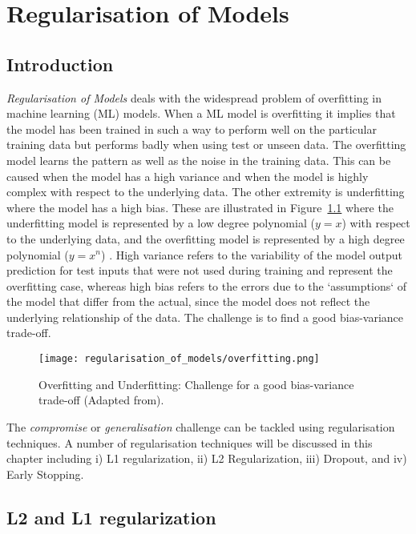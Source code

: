 \chapter{Regularisation of Models}
\label{ch:regularisation-of-models}


\section{Introduction}


\textit{Regularisation of Models} deals with the widespread problem of overfitting in machine learning (ML) models. When a ML model is overfitting it implies that the model has been trained in such a way to perform well on the particular training data but performs badly when using test or unseen data. The overfitting model learns the pattern as well as the noise in the training data. This can be caused when the model has a high variance and when the model is highly complex with respect to the underlying data. The other extremity is underfitting where the model has a high bias. These are illustrated in Figure~\ref{fig:rom_overfitting} where the underfitting model is represented by a low degree polynomial ($y = x$) with respect to the underlying data, and the overfitting model is represented by a high degree polynomial ($y = x^{n}$) \citep{pythonmachinelearning}. High variance refers to the variability of the model output prediction for test inputs that were not used during training and represent the overfitting case, whereas high bias refers to the errors due to the `assumptions` of the model that differ from the actual, since the model does not reflect the underlying relationship of the data. The challenge is to find a good bias-variance trade-off.

\begin{figure}
  \texttt{[image: regularisation\_of\_models/overfitting.png]}
  \caption{Overfitting and Underfitting: Challenge for a good bias-variance trade-off (Adapted from\citet{pythonmachinelearning}). }
  \label{fig:rom_overfitting}
\end{figure}


The \textit{compromise} or \textit{generalisation} challenge can be tackled using regularisation techniques. A number of regularisation techniques will be discussed in this chapter including i) L1 regularization, ii) L2 Regularization, iii) Dropout, and iv) Early Stopping.


\section{L2 and L1 regularization} 


